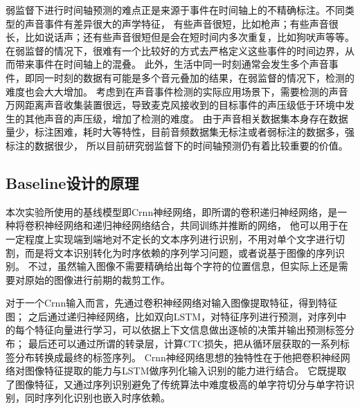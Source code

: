 \documentclass[]{ctexart}
\begin{document}
弱监督下进行时间轴预测的难点正是来源于事件在时间轴上的不精确标注。不同类型的声音事件有差异很大的声学特征，
有些声音很短，比如枪声；有些声音很长，比如说话声；还有些声音很短但是会在短时间内多次重复，比如狗吠声等等。
在弱监督的情况下，很难有一个比较好的方式去严格定义这些事件的时间边界，从而带来事件在时间轴上的混叠。
此外，生活中同一时刻通常会发生多个声音事件，即同一时刻的数据有可能是多个音元叠加的结果，在弱监督的情况下，检测的难度也会大大增加。
考虑到在声音事件检测的实际应用场景下，需要检测的声音万网距离声音收集装置很远，导致麦克风接收到的目标事件的声压级低于环境中发生的其他声音的声压级，增加了检测的难度。
由于声音相关数据集本身存在数据量少，标注困难，耗时大等特性，目前音频数据集无标注或者弱标注的数据多，强标注的数据很少，
所以目前研究弱监督下的时间轴预测仍有着比较重要的价值。

\subsection{Baseline设计的原理}
本次实验所使用的基线模型即Crnn神经网络，即所谓的卷积递归神经网络，是一种将卷积神经网络和递归神经网络结合，共同训练并推断的网络，
他可以用于在一定程度上实现端到端地对不定长的文本序列进行识别，不用对单个文字进行切割，而是将文本识别转化为时序依赖的序列学习问题，或者说基于图像的序列识别。
不过，虽然输入图像不需要精确给出每个字符的位置信息，但实际上还是需要对原始的图像进行前期的裁剪工作。

对于一个Crnn输入而言，先通过卷积神经网络对输入图像提取特征，得到特征图；
之后通过递归神经网络，比如双向LSTM，对特征序列进行预测，对序列中的每个特征向量进行学习，可以依据上下文信息做出逐帧的决策并输出预测标签分布；
最后还可以通过所谓的转录层，计算CTC损失，把从循环层获取的一系列标签分布转换成最终的标签序列。
Crnn神经网络思想的独特性在于他把卷积神经网络对图像特征提取的能力与LSTM做序列化输入识别的能力进行结合。
它既提取了图像特征，又通过序列识别避免了传统算法中难度极高的单字符切分与单字符识别，同时序列化识别也嵌入时序依赖。
\end{document}
